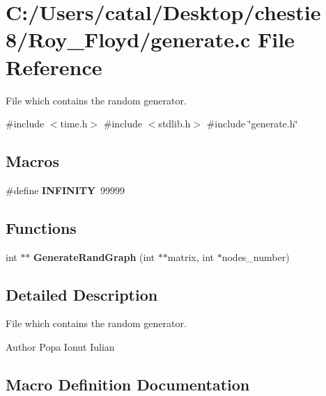 \section{C\+:/\+Users/catal/\+Desktop/chestie 8/\+Roy\+\_\+\+Floyd/generate.c File Reference}
\label{generate_8c}


File which contains the random generator.  


{\ttfamily \#include $<$time.\+h$>$}\newline
{\ttfamily \#include $<$stdlib.\+h$>$}\newline
{\ttfamily \#include \char`\"{}generate.\+h\char`\"{}}\newline
\subsection*{Macros}
\begin{DoxyCompactItemize}
\item 
\#define \textbf{ I\+N\+F\+I\+N\+I\+TY}~99999
\end{DoxyCompactItemize}
\subsection*{Functions}
\begin{DoxyCompactItemize}
\item 
int $\ast$$\ast$ \textbf{ Generate\+Rand\+Graph} (int $\ast$$\ast$matrix, int $\ast$nodes\+\_\+number)
\end{DoxyCompactItemize}


\subsection{Detailed Description}
File which contains the random generator. 

\begin{DoxyAuthor}{Author}
Popa Ionut Iulian 
\end{DoxyAuthor}


\subsection{Macro Definition Documentation}
\mbox{\label{generate_8c_a956e2723d559858d08644ac99146e910}} 
